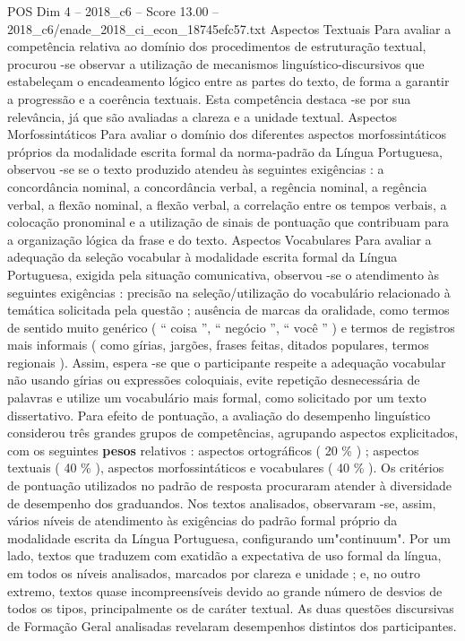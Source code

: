 \begin{textsample}{POS Dim 4 – 2018\_c6 – Score 13.00 – 2018\_c6/enade\_2018\_ci\_econ\_18745efc57.txt}
Aspectos Textuais Para avaliar a competência relativa ao domínio dos procedimentos de estruturação textual, procurou -se observar a utilização de mecanismos linguístico-discursivos que estabeleçam o encadeamento lógico entre as partes do texto, de forma a garantir a progressão e a coerência textuais.
Esta competência destaca -se por sua relevância, já que são avaliadas a clareza e a unidade textual.
Aspectos Morfossintáticos Para avaliar o domínio dos diferentes aspectos morfossintáticos próprios da modalidade escrita formal da norma-padrão da Língua Portuguesa, observou -se se o texto produzido atendeu às seguintes exigências : a concordância nominal, a concordância verbal, a regência nominal, a regência verbal, a flexão nominal, a flexão verbal, a correlação entre os tempos verbais, a colocação pronominal e a utilização de sinais de pontuação que contribuam para a organização lógica da frase e do texto.
Aspectos Vocabulares Para avaliar a adequação da seleção vocabular à modalidade escrita formal da Língua Portuguesa, exigida pela situação comunicativa, observou -se o atendimento às seguintes exigências : precisão na seleção/utilização do vocabulário relacionado à temática solicitada pela questão ; ausência de marcas da oralidade, como termos de sentido muito genérico ( “ coisa ”, “ negócio ”, “ você ” ) e termos de registros mais informais ( como gírias, jargões, frases feitas, ditados populares, termos regionais ).
Assim, espera -se que o participante respeite a adequação vocabular não usando gírias ou expressões coloquiais, evite repetição desnecessária de palavras e utilize um vocabulário mais formal, como solicitado por um texto dissertativo.
Para efeito de pontuação, a avaliação do desempenho linguístico considerou três grandes grupos de competências, agrupando aspectos explicitados, com os seguintes \textbf{pesos} relativos : aspectos ortográficos ( 20 \% ) ; aspectos textuais ( 40 \% ), aspectos morfossintáticos e vocabulares ( 40 \% ).
Os critérios de pontuação utilizados no padrão de resposta procuraram atender à diversidade de desempenho dos graduandos.
Nos textos analisados, observaram -se, assim, vários níveis de atendimento às exigências do padrão formal próprio da modalidade escrita da Língua Portuguesa, configurando um"continuum".
Por um lado, textos que traduzem com exatidão a expectativa de uso formal da língua, em todos os níveis analisados, marcados por clareza e unidade ; e, no outro extremo, textos quase incompreensíveis devido ao grande número de desvios de todos os tipos, principalmente os de caráter textual.
As duas questões discursivas de Formação Geral analisadas revelaram desempenhos distintos dos participantes.

\end{textsample}
